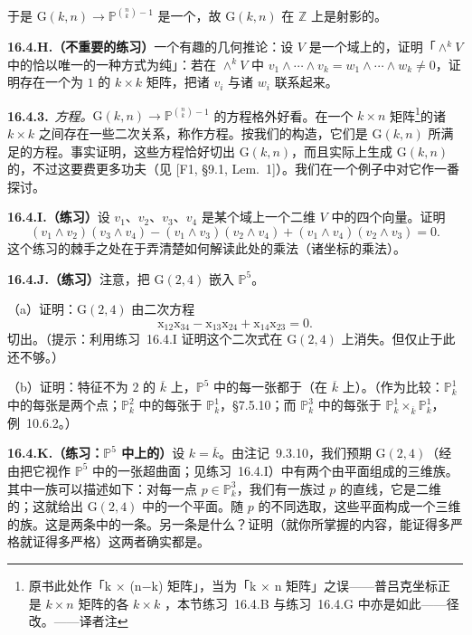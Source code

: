 于是 $\mathrm{G}(k,n)\to\mathbb{P}^{\binom{n}{k}-1}$ 是一个\trClosedEmbedding，故 $\mathrm{G}(k,n)$ 在 $\mathbb{Z}$ 上是射影的。

\textbf{16.4.H.（不重要的练习）}\quad 一个有趣的几何推论：设 $V$ 是一个域上的\trVectorSpace，证明「$\wedge^k V$ 中的\trPureTensor{}恰以唯一的一种方式为纯」：若在 $\wedge^k V$ 中 $v_1\wedge\cdots\wedge v_k=w_1\wedge\cdots\wedge w_k\neq 0$，证明存在一个\trDeterminant{}为 $1$ 的 $k\times k$ 矩阵，把诸 $v_i$ 与诸 $w_i$ 联系起来。

\textbf{16.4.3.}\ \emph{\trPlucker{}方程。}\quad $\mathrm{G}(k,n)\to\mathbb{P}^{\binom{n}{k}-1}$ 的方程格外好看。在一个 $k\times n$ 矩阵\footnote{原书此处作「k × (n−k) 矩阵」，当为「k × n 矩阵」之误——普吕克坐标正是 $k\times n$ 矩阵的各 $k\times k$ \trMinor，本节\mbox{练习~16.4.B} 与\mbox{练习~16.4.G} 中亦是如此——径改。——译者注}的诸 $k\times k$ \trMinor{}之间存在一些二次关系，称作\trPlucker{}方程。按我们的构造，它们是 $\mathrm{G}(k,n)$ 所满足的方程。事实证明，这些方程恰好切出 $\mathrm{G}(k,n)$，而且实际上生成 $\mathrm{G}(k,n)$ 的\trHomogeneous\trIdeal，不过这要费更多功夫（见 [F1, \S9.1, Lem.~1]）。我们在一个例子中对它作一番探讨。

\textbf{16.4.I.（练习）}\quad 设 $v_1$、$v_2$、$v_3$、$v_4$ 是某个域上一个二维\trVectorSpace{} $V$ 中的四个向量。证明
\[
(v_1\wedge v_2)(v_3\wedge v_4)-(v_1\wedge v_3)(v_2\wedge v_4)+(v_1\wedge v_4)(v_2\wedge v_3)=0.
\]
这个练习的棘手之处在于弄清楚如何解读此处的乘法（诸\trPlucker{}坐标的乘法）。

\textbf{16.4.J.（练习）}\quad 注意，\trPluckerEmbedding{}把\trGrassmannian{} $\mathrm{G}(2,4)$ 嵌入 $\mathbb{P}^5$。

（a）证明：$\mathrm{G}(2,4)$ 由二次方程
\[
\mathrm{x}_{12}\mathrm{x}_{34}-\mathrm{x}_{13}\mathrm{x}_{24}+\mathrm{x}_{14}\mathrm{x}_{23}=0.
\]
切出。（提示：利用\mbox{练习~16.4.I} 证明这个二次式在 $\mathrm{G}(2,4)$ 上消失。但仅止于此还不够。）

（b）证明：特征不为 $2$ 的\trAlgClosedField{} $\overline{k}$ 上，$\mathbb{P}^5$ 中的每一张\trSmooth{}\trQuadricHypersurface{}都\trIsomorphic{}于\trGrassmannian{}（在 $\overline{k}$ 上）。（作为比较：$\mathbb{P}^1_k$ 中的每张\trSmooth{}\trQuadricHypersurface{}是两个点；$\mathbb{P}^2_k$ 中的每张\trSmooth{}\trQuadricHypersurface\trIsomorphic{}于 $\mathbb{P}^1_k$，\S7.5.10；而 $\mathbb{P}^3_k$ 中的每张\trSmooth{}\trQuadricHypersurface\trIsomorphic{}于 $\mathbb{P}^1_k\times_{\overline{k}}\mathbb{P}^1_k$，\mbox{例~10.6.2}。）

\textbf{16.4.K.（练习：$\mathbb{P}^5$ 中\trQuadricSurface{}上的\trRuling）}\quad 设 $k=\overline{k}$。由\mbox{注记~9.3.10}，我们预期 $\mathrm{G}(2,4)$（经由\trPluckerEmbedding{}把它视作 $\mathbb{P}^5$ 中的一张超曲面；见\mbox{练习~16.4.I}）中有两个由平面组成的三维族。其中一族可以描述如下：对每一点 $p\in\mathbb{P}^3_k$，我们有一族过 $p$ 的直线，它是二维的；这就给出 $\mathrm{G}(2,4)$ 中的一个平面。随 $p$ 的不同选取，这些平面构成一个三维的族。这是两条\trRuling{}中的一条。另一条是什么？证明（就你所掌握的内容，能证得多严格就证得多严格）这两者确实都是\trRuling。

